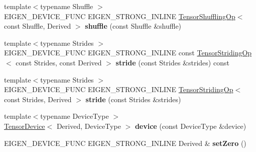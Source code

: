 \begin{DoxyCompactItemize}
\item 
\mbox{\label{class_eigen_1_1_tensor_base_aabecda1dcfdfd4d699f2fc174b7619a6}} 
{\footnotesize template$<$typename Shuffle $>$ }\\E\+I\+G\+E\+N\+\_\+\+D\+E\+V\+I\+C\+E\+\_\+\+F\+U\+NC E\+I\+G\+E\+N\+\_\+\+S\+T\+R\+O\+N\+G\+\_\+\+I\+N\+L\+I\+NE \hyperlink{class_eigen_1_1_tensor_shuffling_op}{Tensor\+Shuffling\+Op}$<$ const Shuffle, Derived $>$ {\bfseries shuffle} (const Shuffle \&shuffle)
\item 
\mbox{\label{class_eigen_1_1_tensor_base_ac0b491ea9d2608668526b7d31c904117}} 
{\footnotesize template$<$typename Strides $>$ }\\E\+I\+G\+E\+N\+\_\+\+D\+E\+V\+I\+C\+E\+\_\+\+F\+U\+NC E\+I\+G\+E\+N\+\_\+\+S\+T\+R\+O\+N\+G\+\_\+\+I\+N\+L\+I\+NE const \hyperlink{class_eigen_1_1_tensor_striding_op}{Tensor\+Striding\+Op}$<$ const Strides, const Derived $>$ {\bfseries stride} (const Strides \&strides) const
\item 
\mbox{\label{class_eigen_1_1_tensor_base_a3d1e2494393302591784c0939641e937}} 
{\footnotesize template$<$typename Strides $>$ }\\E\+I\+G\+E\+N\+\_\+\+D\+E\+V\+I\+C\+E\+\_\+\+F\+U\+NC E\+I\+G\+E\+N\+\_\+\+S\+T\+R\+O\+N\+G\+\_\+\+I\+N\+L\+I\+NE \hyperlink{class_eigen_1_1_tensor_striding_op}{Tensor\+Striding\+Op}$<$ const Strides, Derived $>$ {\bfseries stride} (const Strides \&strides)
\item 
\mbox{\label{class_eigen_1_1_tensor_base_a59f3f88e7ceecd4648b1776ac018e375}} 
{\footnotesize template$<$typename Device\+Type $>$ }\\\hyperlink{class_eigen_1_1_tensor_device}{Tensor\+Device}$<$ Derived, Device\+Type $>$ {\bfseries device} (const Device\+Type \&device)
\item 
\mbox{\label{class_eigen_1_1_tensor_base_a99741c656da28bd2ea355d08cd52edfa}} 
E\+I\+G\+E\+N\+\_\+\+D\+E\+V\+I\+C\+E\+\_\+\+F\+U\+NC E\+I\+G\+E\+N\+\_\+\+S\+T\+R\+O\+N\+G\+\_\+\+I\+N\+L\+I\+NE Derived \& {\bfseries set\+Zero} ()
\item 
\mbox{\label{class_eigen_1_1_tensor_base_a8c19f5a6f239acf25c0932f34c343457}} 

\end{DoxyCompactItemize}
